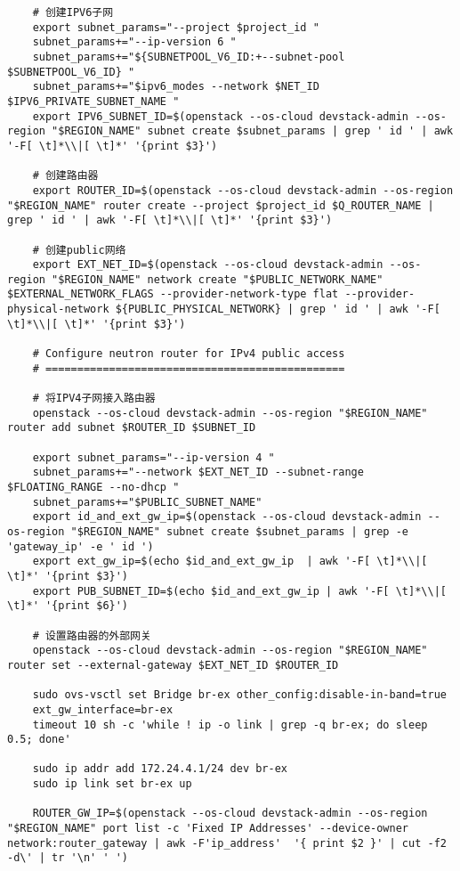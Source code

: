\documentclass[a4paper,left=1.5cm,right=1.5cm,11pt]{article}
\begin{document}
\begin{lstlisting}
	# 创建IPV6子网
	export subnet_params="--project $project_id "
	subnet_params+="--ip-version 6 "
	subnet_params+="${SUBNETPOOL_V6_ID:+--subnet-pool $SUBNETPOOL_V6_ID} "
    subnet_params+="$ipv6_modes --network $NET_ID $IPV6_PRIVATE_SUBNET_NAME "
	export IPV6_SUBNET_ID=$(openstack --os-cloud devstack-admin --os-region "$REGION_NAME" subnet create $subnet_params | grep ' id ' | awk '-F[ \t]*\\|[ \t]*' '{print $3}')

	# 创建路由器
	export ROUTER_ID=$(openstack --os-cloud devstack-admin --os-region "$REGION_NAME" router create --project $project_id $Q_ROUTER_NAME | grep ' id ' | awk '-F[ \t]*\\|[ \t]*' '{print $3}')

	# 创建public网络
	export EXT_NET_ID=$(openstack --os-cloud devstack-admin --os-region "$REGION_NAME" network create "$PUBLIC_NETWORK_NAME" $EXTERNAL_NETWORK_FLAGS --provider-network-type flat --provider-physical-network ${PUBLIC_PHYSICAL_NETWORK} | grep ' id ' | awk '-F[ \t]*\\|[ \t]*' '{print $3}')

	# Configure neutron router for IPv4 public access
	# ===============================================

	# 将IPV4子网接入路由器
	openstack --os-cloud devstack-admin --os-region "$REGION_NAME" router add subnet $ROUTER_ID $SUBNET_ID

	export subnet_params="--ip-version 4 "
	subnet_params+="--network $EXT_NET_ID --subnet-range $FLOATING_RANGE --no-dhcp "
    subnet_params+="$PUBLIC_SUBNET_NAME"
	export id_and_ext_gw_ip=$(openstack --os-cloud devstack-admin --os-region "$REGION_NAME" subnet create $subnet_params | grep -e 'gateway_ip' -e ' id ')
	export ext_gw_ip=$(echo $id_and_ext_gw_ip  | awk '-F[ \t]*\\|[ \t]*' '{print $3}')
    export PUB_SUBNET_ID=$(echo $id_and_ext_gw_ip | awk '-F[ \t]*\\|[ \t]*' '{print $6}')

	# 设置路由器的外部网关
	openstack --os-cloud devstack-admin --os-region "$REGION_NAME" router set --external-gateway $EXT_NET_ID $ROUTER_ID

	sudo ovs-vsctl set Bridge br-ex other_config:disable-in-band=true
	ext_gw_interface=br-ex
	timeout 10 sh -c 'while ! ip -o link | grep -q br-ex; do sleep 0.5; done'

	sudo ip addr add 172.24.4.1/24 dev br-ex
    sudo ip link set br-ex up

	ROUTER_GW_IP=$(openstack --os-cloud devstack-admin --os-region "$REGION_NAME" port list -c 'Fixed IP Addresses' --device-owner network:router_gateway | awk -F'ip_address'  '{ print $2 }' | cut -f2 -d\' | tr '\n' ' ')


\end{lstlisting}
\end{document}
